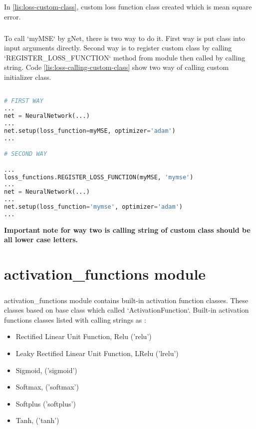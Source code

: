\documentclass[12pt]{report}
\begin{document}
In \ref{lis:loss-custom-class}, custom loss function class created which is mean square error. 

\paragraph{}
To call `myMSE` by gNet, there is two way to do it. First way is put class into input arguments directly. Second way is to register custom class by calling `REGISTER\_LOSS\_FUNCTION` method from module then called by calling string. Code \ref{lis:loss-calling-custom-class} show two way of calling custom initializer class.

\begin{lstlisting}[language=Python, numbers=none, caption={Calling custom loss function class.}, label={lis:loss-calling-custom-class}]

# FIRST WAY
...
net = NeuralNetwork(...)
...
net.setup(loss_function=myMSE, optimizer='adam')
...

# SECOND WAY

...
loss_functions.REGISTER_LOSS_FUNCTION(myMSE, 'mymse')
...
net = NeuralNetwork(...)
...
net.setup(loss_function='mymse', optimizer='adam')
...

\end{lstlisting}

\textbf{Important note for way two is calling string of custom class should be all lower case letters. }




\chapter{activation\_functions module}

\paragraph{}
activation\_functions module contains built-in activation function classes. These classes based on base class which called `ActivationFunction`. Built-in activation functions classes listed with calling strings as : 

\begin{itemize}
	\item	Rectified Linear Unit Function, Relu ('relu')
	\item	Leaky Rectified Linear Unit Function, LRelu ('lrelu')
	\item	Sigmoid, ('sigmoid')
	\item	Softmax, ('softmax')
	\item	Softplus ('softplus')
	\item	Tanh, ('tanh')
\end{itemize}
\end{document}
